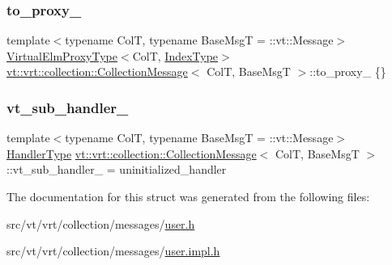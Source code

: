 \subsubsection{\texorpdfstring{to\+\_\+proxy\+\_\+}{to\_proxy\_}}
{\footnotesize\ttfamily template$<$typename ColT, typename Base\+MsgT = \+::vt\+::\+Message$>$ \\
\hyperlink{namespacevt_1_1vrt_a620a5c8c59d13e513f690c74b4af516f}{Virtual\+Elm\+Proxy\+Type}$<$ColT, \hyperlink{structvt_1_1vrt_1_1collection_1_1_collection_message_a324978c38e67d1bfa86c8db172e77594}{Index\+Type}$>$ \hyperlink{structvt_1_1vrt_1_1collection_1_1_collection_message}{vt\+::vrt\+::collection\+::\+Collection\+Message}$<$ ColT, Base\+MsgT $>$\+::to\+\_\+proxy\+\_\+ \{\}\hspace{0.3cm}{\ttfamily [private]}}

\mbox{\label{structvt_1_1vrt_1_1collection_1_1_collection_message_a6886f8da35617183db4aa87b259ec7df}} 
\subsubsection{\texorpdfstring{vt\+\_\+sub\+\_\+handler\+\_\+}{vt\_sub\_handler\_}}
{\footnotesize\ttfamily template$<$typename ColT, typename Base\+MsgT = \+::vt\+::\+Message$>$ \\
\hyperlink{namespacevt_af64846b57dfcaf104da3ef6967917573}{Handler\+Type} \hyperlink{structvt_1_1vrt_1_1collection_1_1_collection_message}{vt\+::vrt\+::collection\+::\+Collection\+Message}$<$ ColT, Base\+MsgT $>$\+::vt\+\_\+sub\+\_\+handler\+\_\+ = uninitialized\+\_\+handler\hspace{0.3cm}{\ttfamily [private]}}



The documentation for this struct was generated from the following files\+:\begin{DoxyCompactItemize}
\item 
src/vt/vrt/collection/messages/\hyperlink{user_8h}{user.\+h}\item 
src/vt/vrt/collection/messages/\hyperlink{user_8impl_8h}{user.\+impl.\+h}\end{DoxyCompactItemize}
